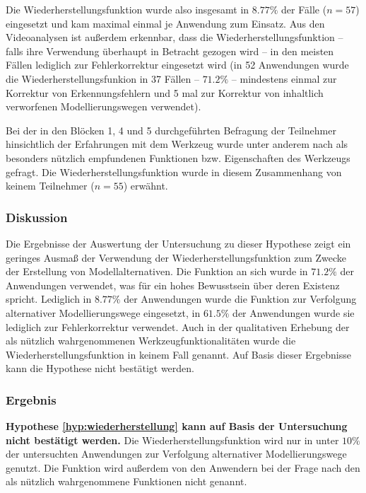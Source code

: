 Die Wiederherstellungsfunktion wurde also insgesamt in $8.77\%$ der Fälle ($n=57$) eingesetzt und kam maximal einmal je Anwendung zum Einsatz.  Aus den Videoanalysen ist außerdem erkennbar, dass die Wiederherstellungsfunktion -- falls ihre Verwendung überhaupt in Betracht gezogen wird -- in den meisten Fällen lediglich zur Fehlerkorrektur eingesetzt wird (in 52 Anwendungen wurde die Wiederherstellungsfunkion in 37 Fällen -- $71.2\%$ -- mindestens einmal zur Korrektur von Erkennungsfehlern und 5 mal zur Korrektur von inhaltlich verworfenen Modellierungswegen verwendet).

Bei der in den Blöcken 1, 4 und 5 durchgeführten Befragung der Teilnehmer hinsichtlich der Erfahrungen mit dem Werkzeug wurde unter anderem nach als besonders nützlich empfundenen Funktionen bzw. Eigenschaften des Werkzeugs gefragt. Die Wiederherstellungsfunktion wurde in diesem Zusammenhang von keinem Teilnehmer ($n=55$) erwähnt. 

\subsubsection{Diskussion} 

Die Ergebnisse der Auswertung der Untersuchung zu dieser Hypothese zeigt ein geringes Ausmaß der Verwendung der Wiederherstellungsfunktion zum Zwecke der Erstellung von Modellalternativen. Die Funktion an sich wurde in $71.2\%$ der Anwendungen verwendet, was für ein hohes Bewusstsein über deren Existenz spricht. Lediglich in $8.77\%$ der Anwendungen wurde die Funktion zur Verfolgung alternativer Modellierungswege eingesetzt, in $61.5\%$ der Anwendungen wurde sie lediglich zur Fehlerkorrektur verwendet. Auch in der qualitativen Erhebung der als nützlich wahrgenommenen Werkzeugfunktionalitäten wurde die Wiederherstellungsfunktion in keinem Fall genannt. Auf Basis dieser Ergebnisse kann die Hypothese nicht bestätigt werden. 

\subsubsection{Ergebnis} 

\textbf{Hypothese \ref{hyp:wiederherstellung} kann auf Basis der Untersuchung nicht bestätigt werden.} Die Wiederherstellungsfunktion wird nur in unter $10\%$ der untersuchten Anwendungen  zur Verfolgung alternativer Modellierungswege genutzt. Die Funktion wird außerdem von den Anwendern bei der Frage nach den als nützlich wahrgenommene Funktionen nicht genannt.

